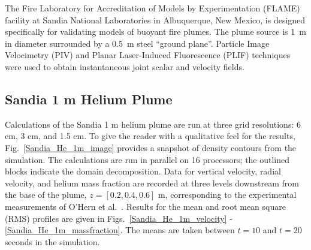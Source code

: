 The Fire Laboratory for Accreditation of Models by Experimentation (FLAME) facility \cite{OHern:2005,Blanchat:2001} at Sandia National Laboratories in Albuquerque, New Mexico, is designed specifically for validating models of buoyant fire plumes.  The plume source is 1~m in diameter surrounded by a 0.5~m steel ``ground plane''. Particle Image Velocimetry (PIV) and Planar Laser-Induced Fluorescence (PLIF) techniques were used to obtain instantaneous joint scalar and velocity fields.

\subsection{Sandia 1 m Helium Plume}
\label{Sandia plume}

Calculations of the Sandia 1 m helium plume are run at three grid resolutions: 6 cm, 3 cm, and 1.5 cm.  To give the reader with a qualitative feel for the results, Fig.~\ref{Sandia_He_1m_image} provides a snapshot of density contours from the simulation. The calculations are run in parallel on 16 processors; the outlined blocks indicate the domain decomposition.  Data for vertical velocity, radial velocity, and helium mass fraction are recorded at three levels downstream from the base of the plume, $z = [0.2, 0.4, 0.6]$ m, corresponding to the experimental measurements of O'Hern et al.~\cite{OHern:2005}.  Results for the mean and root mean square (RMS) profiles are given in Figs.~\ref{Sandia_He_1m_velocity} - \ref{Sandia_He_1m_massfraction}.  The means are taken between $t=10$ and $t=20$ seconds in the simulation.


